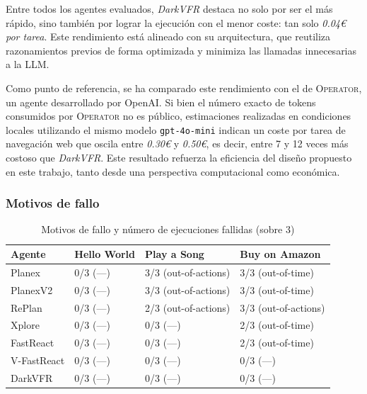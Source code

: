 Entre todos los agentes evaluados, \emph{DarkVFR} destaca no solo por ser el
más rápido, sino también por lograr la ejecución con el menor coste: tan solo
\emph{0.04€ por tarea}. Este rendimiento está alineado con su arquitectura, que
reutiliza razonamientos previos de forma optimizada y minimiza las llamadas
innecesarias a la LLM.

Como punto de referencia, se ha comparado este rendimiento con el de
\textsc{Operator}, un agente desarrollado por OpenAI. Si bien el número exacto
de tokens consumidos por \textsc{Operator} no es público, estimaciones
realizadas en condiciones locales utilizando el mismo modelo \texttt{gpt-4o-mini} 
indican un coste por tarea de navegación web que oscila entre \emph{0.30€} y \emph{0.50€}, es
decir, entre 7 y 12 veces más costoso que \emph{DarkVFR}. Este resultado
refuerza la eficiencia del diseño propuesto en este trabajo, tanto desde una
perspectiva computacional como económica.

\subsubsection{Motivos de fallo}

\begin{table}[!h]
\centering
\caption{Motivos de fallo y número de ejecuciones fallidas (sobre 3)}
\label{tab:failure-reasons-count}
\begin{tabular}{p{2.5cm} p{3.5cm} p{3.5cm} p{3.5cm}}
\toprule
\textbf{Agente} & \textbf{Hello World} & \textbf{Play a Song} & \textbf{Buy on Amazon} \\
\midrule
Planex       & 0/3 (—)                  & 3/3 (out-of-actions) & 3/3 (out-of-time)    \\
PlanexV2     & 0/3 (—)                  & 3/3 (out-of-actions) & 3/3 (out-of-time)    \\
RePlan       & 0/3 (—)                  & 2/3 (out-of-actions) & 3/3 (out-of-actions) \\
Xplore       & 0/3 (—)                  & 0/3 (—)              & 2/3 (out-of-time)    \\
FastReact    & 0/3 (—)                  & 0/3 (—)              & 2/3 (out-of-time)    \\
V-FastReact  & 0/3 (—)                  & 0/3 (—)              & 0/3 (—)              \\
DarkVFR      & 0/3 (—)                  & 0/3 (—)              & 0/3 (—)              \\
\bottomrule
\end{tabular}
\end{table}

